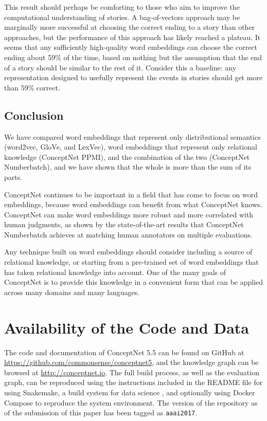 \documentclass[letterpaper]{article}
\begin{document}
This result should perhaps be comforting to those who aim to improve the
computational understanding of stories. A bag-of-vectors approach may be
marginally more successful at choosing the correct ending to a story than other
approaches, but the performance of this approach has likely reached a plateau.
It seems that any sufficiently high-quality word embeddings can choose the
correct ending about 59\% of the time, based on nothing but the assumption that
the end of a story should be similar to the rest of it. Consider this a
baseline: any representation designed to usefully represent the events in
stories should get more than 59\% correct.

\subsection{Conclusion}

We have compared word embeddings that represent only distributional semantics
(word2vec, GloVe, and LexVec), word embeddings that represent only
relational knowledge (ConceptNet PPMI), and the combination of the two
(ConceptNet Numberbatch), and we have shown that the whole is more than the sum
of its parts.

ConceptNet continues to be important in a field that has come to focus on word
embeddings, because word embeddings can benefit from what ConceptNet knows.
ConceptNet can make word embeddings more robust and more correlated with human
judgments, as shown by the state-of-the-art results that ConceptNet Numberbatch
achieves at matching human annotators on multiple evaluations.

Any technique built on word embeddings should
consider including a source of relational knowledge, or starting from a
pre-trained set of word embeddings that has taken relational knowledge into
account. One of the many goals of ConceptNet is to provide this knowledge in a
convenient form that can be applied across many domains and many languages.

\section{Availability of the Code and Data}

The code and documentation of ConceptNet 5.5 can be found on GitHub at
\url{https://github.com/commonsense/conceptnet5}, and the knowledge graph can
be browsed at \url{http://conceptnet.io}.  The full build process, as well as
the evaluation graph, can be reproduced using the instructions included in the
README file for using Snakemake, a build system for data science
\cite{koster2012snakemake}, and optionally using Docker Compose to reproduce
the system environment.  The version of the repository as of the submission of
this paper has been tagged as {\tt aaai2017}.
\end{document}
